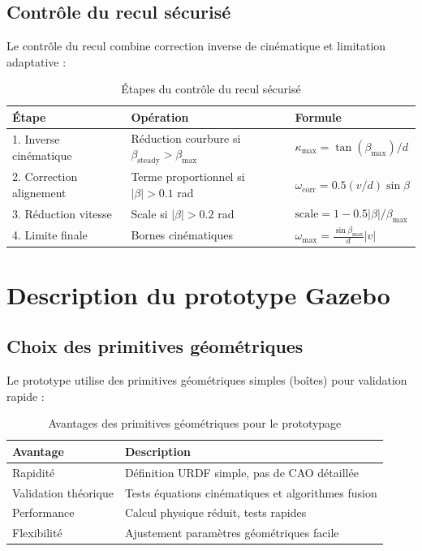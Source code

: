 \documentclass[a4paper,12pt]{report}
\begin{document}
\subsection{Contrôle du recul sécurisé}
\label{subsec:controle_recul}

Le contrôle du recul combine correction inverse de cinématique et limitation adaptative :

\begin{table}[htbp]
    \centering
    \begin{tabular}{p{2.5cm}p{5cm}p{4cm}}
        \toprule
        \textbf{Étape} & \textbf{Opération} & \textbf{Formule} \\
        \midrule
        1. Inverse cinématique & Réduction courbure si $\beta_{\text{steady}} > \beta_{\max}$ & $\kappa_{\max} = \tan(\beta_{\max})/d$ \\
        2. Correction alignement & Terme proportionnel si $|\beta| > 0.1$ rad & $\omega_{\text{corr}} = 0.5(v/d)\sin\beta$ \\
        3. Réduction vitesse & Scale si $|\beta| > 0.2$ rad & $\text{scale} = 1-0.5|\beta|/\beta_{\max}$ \\
        4. Limite finale & Bornes cinématiques & $\omega_{\max} = \frac{\sin\beta_{\max}}{d}|v|$ \\
        \bottomrule
    \end{tabular}
    \caption{Étapes du contrôle du recul sécurisé}
    \label{tab:controle_recul}
\end{table}

\section{Description du prototype Gazebo}
\label{sec:prototype_gazebo}

\subsection{Choix des primitives géométriques}
\label{subsec:choix_primitives}

Le prototype utilise des primitives géométriques simples (boîtes) pour validation rapide :

\begin{table}[htbp]
    \centering
    \begin{tabular}{lp{10cm}}
        \toprule
        \textbf{Avantage} & \textbf{Description} \\
        \midrule
        Rapidité & Définition URDF simple, pas de CAO détaillée \\
        Validation théorique & Tests équations cinématiques et algorithmes fusion \\
        Performance & Calcul physique réduit, tests rapides \\
        Flexibilité & Ajustement paramètres géométriques facile \\
        \bottomrule
    \end{tabular}
    \caption{Avantages des primitives géométriques pour le prototypage}
    \label{tab:avantages_primitives}
\end{table}
\end{document}
